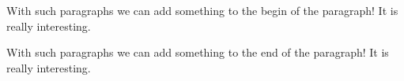 \documentclass{article}
\begin{document}
\vspace*{\fill} \vspace*{-5ex}

\hangindent=1.5cm
 \noindent
With such paragraphs we can add something to the begin of the paragraph! It is really interesting.

\vspace*{\fill}

\hangindent=-1.5cm
 \noindent
With such paragraphs we can add something to the end of the paragraph! It is really interesting.
\vspace*{\fill}
\end{document}
